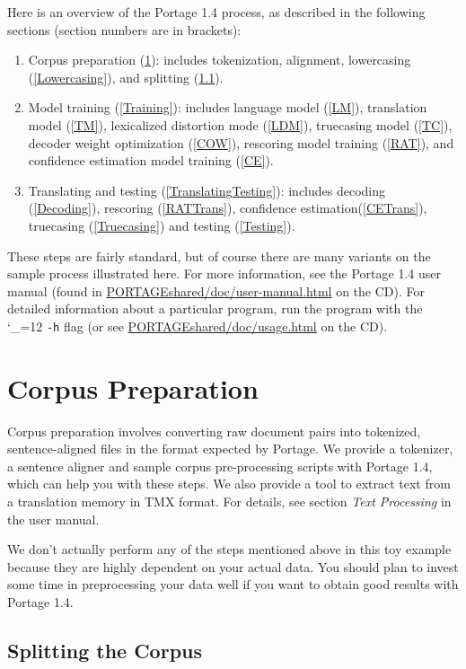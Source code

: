 \documentclass[11pt,letterpaper]{article}
\def\code{\begingroup\catcode`\_=12 \codex}
\newcommand{\codex}[1]{\texttt{#1}\endgroup}
\newcommand{\PS}{Portage 1.4\xspace}
\begin{document}
Here is an overview of the \PS process, as described in the following
sections (section numbers are in brackets):
\begin{enumerate}
\item Corpus preparation (\ref{CorpusPreparation}): includes tokenization,
      alignment, lowercasing (\ref{Lowercasing}), and splitting
      (\ref{Splitting}).
\item Model training (\ref{Training}): includes language model (\ref{LM}),
      translation model (\ref{TM}), lexicalized distortion mode (\ref{LDM}),
      truecasing model (\ref{TC}), decoder weight optimization (\ref{COW}),
      rescoring model training (\ref{RAT}), and confidence estimation model
      training (\ref{CE}).
\item Translating and testing (\ref{TranslatingTesting}): includes
      decoding (\ref{Decoding}), rescoring (\ref{RATTrans}), confidence
      estimation(\ref{CETrans}), truecasing (\ref{Truecasing}) and testing
      (\ref{Testing}).
\end{enumerate}
These steps are fairly standard, but of course there are many variants on the
sample process illustrated here. For more information, see the \PS
user manual (found in \url{PORTAGEshared/doc/user-manual.html} on the CD).
For detailed information about a particular program, run the program with the
\code{-h} flag (or see \url{PORTAGEshared/doc/usage.html} on the CD).

\section{Corpus Preparation} \label{CorpusPreparation}

Corpus preparation involves converting raw document pairs into tokenized,
sentence-aligned files in the format expected by Portage.  We provide a
tokenizer, a sentence aligner and sample corpus pre-processing scripts with
\PS, which can help you with these steps.  We also provide a tool to extract
text from a translation memory in TMX format.  For details, see section
\emph{Text Processing} in the user manual.

We don't actually perform any of the steps mentioned above in this toy example
because they are highly dependent on your actual data.  You should plan to
invest some time in preprocessing your data well if you want to obtain good
results with \PS.

\subsection{Splitting the Corpus} \label{Splitting}
\end{document}
